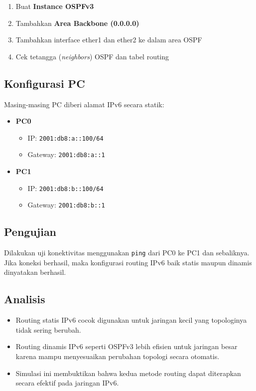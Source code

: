 \begin{enumerate}
    \item Buat \textbf{Instance OSPFv3}
    \item Tambahkan \textbf{Area Backbone (0.0.0.0)}
    \item Tambahkan interface ether1 dan ether2 ke dalam area OSPF
    \item Cek tetangga (\textit{neighbors}) OSPF dan tabel routing
\end{enumerate}

\subsection{Konfigurasi PC}
Masing-masing PC diberi alamat IPv6 secara statik:

\begin{itemize}
    \item \textbf{PC0}
    \begin{itemize}
        \item IP: \texttt{2001:db8:a::100/64}
        \item Gateway: \texttt{2001:db8:a::1}
    \end{itemize}
    \item \textbf{PC1}
    \begin{itemize}
        \item IP: \texttt{2001:db8:b::100/64}
        \item Gateway: \texttt{2001:db8:b::1}
    \end{itemize}
\end{itemize}

\subsection{Pengujian}
Dilakukan uji konektivitas menggunakan \texttt{ping} dari PC0 ke PC1 dan sebaliknya. Jika koneksi berhasil, maka konfigurasi routing IPv6 baik statis maupun dinamis dinyatakan berhasil.

\subsection{Analisis}
\begin{itemize}
    \item Routing statis IPv6 cocok digunakan untuk jaringan kecil yang topologinya tidak sering berubah.
    \item Routing dinamis IPv6 seperti OSPFv3 lebih efisien untuk jaringan besar karena mampu menyesuaikan perubahan topologi secara otomatis.
    \item Simulasi ini membuktikan bahwa kedua metode routing dapat diterapkan secara efektif pada jaringan IPv6.
\end{itemize}

